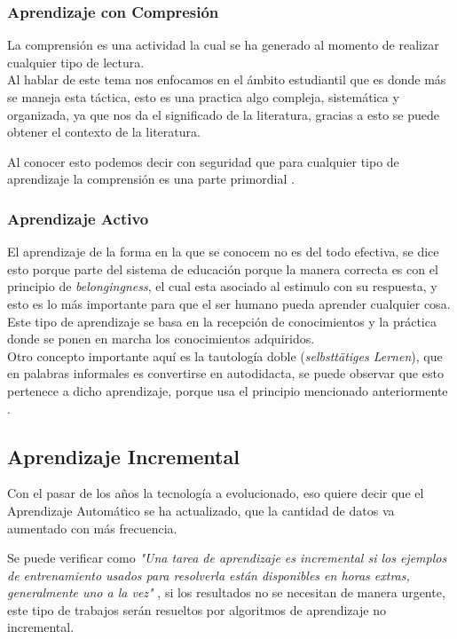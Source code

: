         \subsubsection{Aprendizaje con Compresi\'on}
            La comprensi\'on es una actividad la cual se ha generado al momento de realizar cualquier tipo de lectura.\\
            Al hablar de este tema nos enfocamos en el \'ambito estudiantil que es donde m\'as se maneja esta t\'actica, esto es una
            practica algo compleja, sistemática y organizada, ya que nos da el significado de la literatura, gracias a esto se puede
            obtener el contexto de la literatura.

            Al conocer esto podemos decir con seguridad que para cualquier tipo de aprendizaje la comprensi\'on es 
            una parte primordial \cite{perez2014}.

        \subsubsection{Aprendizaje Activo}
            El aprendizaje de la forma en la que se conocem no es del todo efectiva, se dice esto porque parte del sistema de educaci\'on porque la manera 
            correcta es con el principio de \textit{belongingness}, el cual esta asociado al estimulo con su respuesta,
            y esto es lo m\'as importante para que el ser humano pueda aprender cualquier cosa.\\
            Este tipo de aprendizaje se basa en la recepci\'on de conocimientos y la pr\'actica donde se ponen en marcha los conocimientos adquiridos.\\
            Otro concepto importante aqu\'i es la tautolog\'ia doble (\textit{selbstt\"atiges Lernen}), que en palabras informales es convertirse en autodidacta, 
            se puede observar que esto pertenece a dicho aprendizaje, porque usa el principio mencionado anteriormente \cite{Huber2008}.



    \subsection{Aprendizaje Incremental}
        Con el pasar de los años la tecnología a evolucionado, eso quiere decir que el Aprendizaje Automático se ha actualizado, que la 
        cantidad de datos va aumentado con más frecuencia.
        
        Se puede verificar como \textit{"Una tarea de aprendizaje es incremental si los ejemplos de entrenamiento usados para 
        resolverla están disponibles en horas extras, generalmente uno a la vez"} \cite{GiraudCarrier2000}, si los resultados no se 
        necesitan de manera urgente, este tipo de trabajos serán resueltos por algoritmos de aprendizaje no incremental. 

